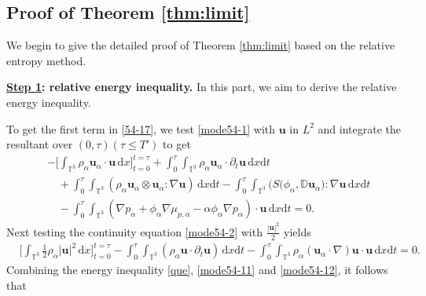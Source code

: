 \documentclass[reqno,a4paper,11pt]{amsart}
\theoremstyle{plain}
\numberwithin{equation}{section}
\renewcommand{\d}{\mathrm{d}}
\newcommand{\dx}{\d x}
\newcommand{\dt}{\d t}
\begin{document}
					\subsection{Proof of Theorem \ref{thm:limit}}
					We begin to give the detailed proof of Theorem \ref{thm:limit} based on  the relative entropy method.
					
					\textbf{\underline{Step 1}: relative energy inequality.} In this part, we aim to derive the relative energy inequality.
					
					To get the first term in \eqref{54-17}, we test \eqref{mode54-1} with $\mathbf{u}$ in $ L^2 $ and integrate the resultant over $(0,\tau)(\tau\leq T')$ to get
					\begin{align}
						& - \bigg[\int_{\mathbb{T}^{3}}\rho_{\alpha}  \mathbf{u}_{\alpha}\cdot \mathbf{u}\,\dx\bigg]_{t=0}^{t=\tau} +  \int_0^\tau\int_{\mathbb{T}^{3}}\rho_{\alpha}  \mathbf{u}_{\alpha}\cdot \partial_{t} \mathbf{u}\,\dx\dt\nonumber \\&\quad+ \int_0^\tau \int_{\mathbb{T}^{3}} \left (\rho_{\alpha}  \mathbf{u}_{\alpha}\otimes
						\mathbf{u}_{\alpha}: \nabla \mathbf{u}\right)\,\dx\dt
						- \int_0^\tau \int_{\mathbb{T}^{3}} \big(S(\phi_{\alpha},\mathbb{ D}\mathbf{u}_{\alpha}\big) : \nabla \mathbf{u}\,\dx\dt
						\nonumber\\
						&
						\label{mode54-11} \quad -  \int_0^\tau\int_{\mathbb{T}^{3}}(\nabla p_{\alpha}+\phi_{\alpha} \nabla \mu_{p,\alpha}-\alpha\phi_{\alpha}\nabla p_{\alpha})\cdot \mathbf{u}\,\dx\dt=0.
					\end{align}
					Next testing the continuity equation \eqref{mode54-2} with $\frac{|\mathbf{u}|^{2}}{2}$ yields
					\begin{align}
						\label{mode54-12}
						& \bigg[\int_{\mathbb{T}^{3}}\frac{1}{2}\rho_{\alpha} |\mathbf{u}|^{2}\,\dx\bigg]_{t=0}^{t=\tau}
						-\int_0^\tau\int_{\mathbb{T}^{3}}(\rho_{\alpha} \mathbf{u} \cdot \partial _{t}\mathbf{u})\,\dx\dt-\int_0^\tau\int_{\mathbb{T}^{3}}\rho_{\alpha} (\mathbf{u}_{\alpha}\cdot \nabla) \mathbf{u} \cdot \mathbf{u}\,\dx\dt=0.
					\end{align}
					Combining the energy inequality \eqref{que}, \eqref{mode54-11} and  \eqref{mode54-12},  it follows that
\end{document}
